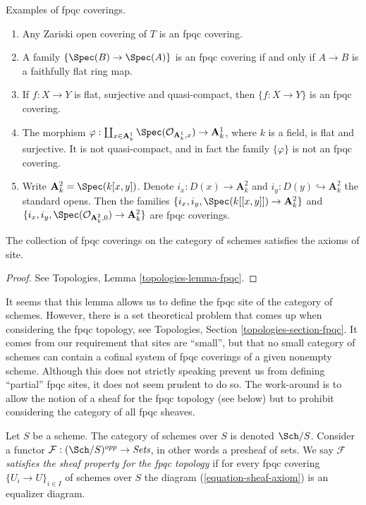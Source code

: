\begin{example}
\label{example-fpqc-coverings}
Examples of fpqc coverings.
\begin{enumerate}
\item Any Zariski open covering of $T$ is an fpqc covering.
\item A family $\{\Spec(B) \to \Spec(A)\}$ is an fpqc
covering if and only if $A \to B$ is a faithfully flat ring map.
\item If $f: X \to Y$ is flat, surjective and quasi-compact, then $\{ f: X\to
Y\}$ is an fpqc covering.
\item The morphism
$\varphi :
\coprod_{x \in \mathbf{A}^1_k} \Spec(\mathcal{O}_{\mathbf{A}^1_k, x})
\to \mathbf{A}^1_k$,
where $k$ is a field, is flat and surjective. It is not quasi-compact, and
in fact the family $\{\varphi\}$ is not an fpqc covering.
\item Write
$\mathbf{A}^2_k = \Spec(k[x, y])$. Denote $i_x : D(x) \to \mathbf{A}^2_k$
and $i_y : D(y) \hookrightarrow \mathbf{A}^2_k$ the standard opens.
Then the families
$\{i_x, i_y, \Spec(k[[x, y]]) \to \mathbf{A}^2_k\}$
and
$\{i_x, i_y, \Spec(\mathcal{O}_{\mathbf{A}^2_k, 0}) \to \mathbf{A}^2_k\}$
are fpqc coverings.
\end{enumerate}
\end{example}

\begin{lemma}
\label{lemma-site-fpqc}
The collection of fpqc coverings on the category of schemes
satisfies the axioms of site.
\end{lemma}

\begin{proof}
See Topologies, Lemma \ref{topologies-lemma-fpqc}.
\end{proof}

\noindent
It seems that this lemma allows us to define the fpqc site of the category
of schemes. However, there is a set theoretical problem that comes up when
considering the fpqc topology, see
Topologies, Section \ref{topologies-section-fpqc}.
It comes from our requirement that sites are ``small'', but that no small
category of schemes can contain a cofinal system of fpqc coverings of a
given nonempty scheme. Although this does not strictly speaking prevent
us from defining  ``partial'' fpqc
sites, it does not seem prudent to do so. The work-around is to allow
the notion of a sheaf for the fpqc topology (see below) but to prohibit
considering the category of all fpqc sheaves.

\begin{definition}
\label{definition-sheaf-property-fpqc}
Let $S$ be a scheme. The category of schemes over $S$ is denoted
$\Sch/S$. Consider a functor
$\mathcal{F} : (\Sch/S)^{opp} \to \textit{Sets}$, in other words
a presheaf of sets. We say $\mathcal{F}$
{\it satisfies the sheaf property for the fpqc topology}
if for every fpqc covering $\{U_i \to U\}_{i \in I}$ of schemes over $S$
the diagram (\ref{equation-sheaf-axiom}) is an equalizer diagram.
\end{definition}

